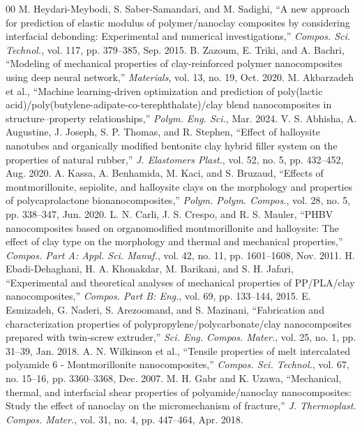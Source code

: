 \documentclass[conference]{IEEEtran}
\begin{document}
\begin{thebibliography}{00}
 M. Heydari-Meybodi, S. Saber-Samandari, and M. Sadighi, ``A new approach for prediction of elastic modulus of polymer/nanoclay composites by considering interfacial debonding: Experimental and numerical investigations,'' \textit{Compos. Sci. Technol.}, vol. 117, pp. 379--385, Sep. 2015.
 B. Zazoum, E. Triki, and A. Bachri, ``Modeling of mechanical properties of clay-reinforced polymer nanocomposites using deep neural network,'' \textit{Materials}, vol. 13, no. 19, Oct. 2020.
 M. Akbarzadeh et al., ``Machine learning-driven optimization and prediction of poly(lactic acid)/poly(butylene-adipate-co-terephthalate)/clay blend nanocomposites in structure–property relationships,'' \textit{Polym. Eng. Sci.}, Mar. 2024.
 V. S. Abhisha, A. Augustine, J. Joseph, S. P. Thomas, and R. Stephen, ``Effect of halloysite nanotubes and organically modified bentonite clay hybrid filler system on the properties of natural rubber,'' \textit{J. Elastomers Plast.}, vol. 52, no. 5, pp. 432--452, Aug. 2020.
 A. Kassa, A. Benhamida, M. Kaci, and S. Bruzaud, ``Effects of montmorillonite, sepiolite, and halloysite clays on the morphology and properties of polycaprolactone bionanocomposites,'' \textit{Polym. Polym. Compos.}, vol. 28, no. 5, pp. 338--347, Jun. 2020.
 L. N. Carli, J. S. Crespo, and R. S. Mauler, ``PHBV nanocomposites based on organomodified montmorillonite and halloysite: The effect of clay type on the morphology and thermal and mechanical properties,'' \textit{Compos. Part A: Appl. Sci. Manuf.}, vol. 42, no. 11, pp. 1601--1608, Nov. 2011.
 H. Ebadi-Dehaghani, H. A. Khonakdar, M. Barikani, and S. H. Jafari, ``Experimental and theoretical analyses of mechanical properties of PP/PLA/clay nanocomposites,'' \textit{Compos. Part B: Eng.}, vol. 69, pp. 133--144, 2015.
 E. Esmizadeh, G. Naderi, S. Arezoomand, and S. Mazinani, ``Fabrication and characterization properties of polypropylene/polycarbonate/clay nanocomposites prepared with twin-screw extruder,'' \textit{Sci. Eng. Compos. Mater.}, vol. 25, no. 1, pp. 31--39, Jan. 2018.
 A. N. Wilkinson et al., ``Tensile properties of melt intercalated polyamide 6 - Montmorillonite nanocomposites,'' \textit{Compos. Sci. Technol.}, vol. 67, no. 15--16, pp. 3360--3368, Dec. 2007.
 M. H. Gabr and K. Uzawa, ``Mechanical, thermal, and interfacial shear properties of polyamide/nanoclay nanocomposites: Study the effect of nanoclay on the micromechanism of fracture,'' \textit{J. Thermoplast. Compos. Mater.}, vol. 31, no. 4, pp. 447--464, Apr. 2018.

\end{thebibliography}
\end{document}

